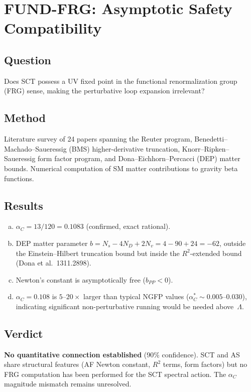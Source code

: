 \documentclass[12pt,a4paper]{article}
\newcommand{\Lam}{\Lambda}
\begin{document}
\section{FUND-FRG: Asymptotic Safety Compatibility}
\label{sec:frg}

\subsection{Question}
Does SCT possess a UV fixed point in the functional renormalization group (FRG)
sense, making the perturbative loop expansion irrelevant?

\subsection{Method}
Literature survey of 24 papers spanning the Reuter program, Benedetti--Machado--Saueressig
(BMS) higher-derivative truncation, Knorr--Ripken--Saueressig form factor program,
and Dona--Eichhorn--Percacci (DEP) matter bounds.  Numerical computation of SM
matter contributions to gravity beta functions.

\subsection{Results}
\begin{enumerate}[(a)]
  \item $\alpha_C = 13/120 = 0.1083$ (confirmed, exact rational).
  \item DEP matter parameter $b = N_s - 4N_D + 2N_v = 4 - 90 + 24 = -62$,
    outside the Einstein--Hilbert truncation bound but inside the $R^2$-extended
    bound (Dona et al.\ 1311.2898).
  \item Newton's constant is asymptotically free ($b_{PP} < 0$).
  \item $\alpha_C = 0.108$ is $5$--$20\times$ larger than typical NGFP values
    ($\alpha_C^* \sim 0.005$--$0.030$), indicating significant non-perturbative
    running would be needed above~$\Lam$.
\end{enumerate}

\subsection{Verdict}
\textbf{No quantitative connection established} (90\% confidence).  SCT and AS
share structural features (AF Newton constant, $R^2$ terms, form factors) but no
FRG computation has been performed for the SCT spectral action.  The $\alpha_C$
magnitude mismatch remains unresolved.
\end{document}

